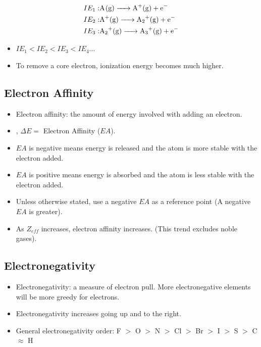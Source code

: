 \documentclass{article}
\begin{document}
\begin{align*}
    IE_1: &\ce{A(g) -> A+(g) + e-} \\
    IE_2: &\ce{A+(g) -> A2+(g) + e-} \\
    IE_3: &\ce{A2+(g) -> A3+(g) + e-} \\
\end{align*}
    
\begin{itemize}
    \item $IE_1 < IE_2 < IE_3 < IE_4 ...$
    \item To remove a core electron, ionization energy becomes much higher.
\end{itemize}

\subsection{Electron Affinity}

\begin{itemize}
    \item Electron affinity: the amount of energy involved with adding an electron.
    \item {}, $\Delta E =$ Electron Affinity ($EA$).
    \item $EA$ is negative means energy is released and the atom is more stable with the electron added.
    \item $EA$ is positive means energy is absorbed and the atom is less stable with the electron added.
    \item Unless otherwise stated, use a negative $EA$ as a reference point (A negative $EA$ is greater).
    \item As $Z_{eff}$ increases, electron affinity increases. (This trend excludes noble gases).
\end{itemize}

\subsection{Electronegativity}

\begin{itemize}
    \item Electronegativity: a measure of electron pull. More electronegative elements will be more greedy for electrons.
    \item Electronegativity increases going up and to the right.
    \item General electronegativity order: F $>$ O $>$ N $>$ Cl $>$ Br $>$ I $>$ S $>$ C $\approx$ H
\end{itemize}
\end{document}
